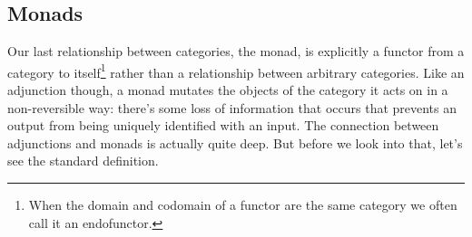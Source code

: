 \documentclass[12pt]{article}
\begin{document}



\subsection*{Monads}
Our last relationship between categories, the monad, is explicitly a functor from a category to itself\footnote{When the domain and codomain of a functor are the same category we often call it an endofunctor.} rather than a relationship between arbitrary categories.
Like an adjunction though, a monad mutates the objects of the category it acts on in a non-reversible way: there's some loss of information that occurs that prevents an output from being uniquely identified with an input.
The connection between adjunctions and monads is actually quite deep.
But before we look into that, let's see the standard definition.
\end{document}
